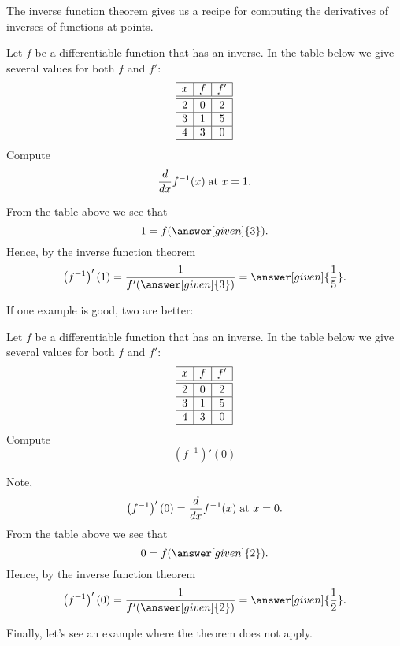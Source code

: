 \documentclass{ximera}
\begin{document}
The inverse function theorem gives us a recipe for computing the
derivatives of inverses of functions at points.

\begin{example}
  Let $f$ be a differentiable function that has an inverse. In the
  table below we give several values for both $f$ and $f'$:
  \[
  \begin{array}{|c|c|c|}\hline
    x & f  & f' \\ \hline \hline
    2 & 0  & 2  \\ \hline
    3 &1  &5 \\ \hline
    4 & 3 & 0  \\ \hline
  \end{array}
  \]
  Compute
  \[
  \frac{d}{\mathop{}\!d x} f^{-1}(x)\;\text{at $x=1$.}
  \]
  \begin{explanation}
    From the table above we see that
    \[
    1 = f(\answer [given]{3}).
    \]
    Hence, by the inverse function theorem
    \[
    \left(f^{-1}\right)' (1)= \frac{1}{f'(\answer[given]{3})} = \answer[given]{\frac{1}{5}}.
    \]
  \end{explanation}
\end{example}

If one example is good, two are better:

\begin{example}
  Let $f$ be a differentiable function that has an inverse. In the
  table below we give several values for both $f$ and $f'$:
  \[
  \begin{array}{|c|c|c|}\hline
    x & f  & f' \\ \hline \hline
    2 & 0  & 2  \\ \hline
    3 & 1  &5 \\ \hline
    4 & 3 & 0  \\ \hline
  \end{array}
  \]
  Compute
  \[
  \left(f^{-1}\right)'(0)
  \]
  \begin{explanation}
    Note,
    \[
    \left(f^{-1}\right)'(0) = \frac{d}{\mathop{}\!d x} f^{-1}(x)\;\text{at $x=0$.}
    \]
    From the table above we see that
    \[
    0 = f(\answer[given]{2}).
    \]
    Hence, by the inverse function theorem
    \[
    \left(f^{-1}\right)'(0) = \frac{1}{f'(\answer[given]{2})} = \answer[given]{\frac{1}{2}}.
    \]
  \end{explanation}
\end{example}

Finally, let's see an example where the theorem does not apply.
\end{document}
